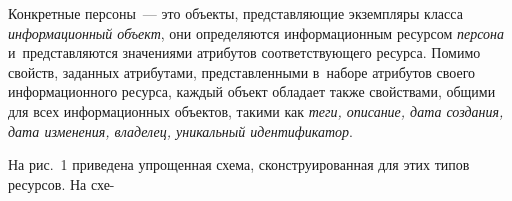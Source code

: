 \begin{multicols}{2}
    Конкретные персоны~--- это объекты, пред\-ставля\-ющие экземпляры 
класса \textit{информационный объект}, они определяются 
информационным ре\-сурсом \textit{персона} и~представляются значениями %
атрибутов соответствующего ресурса. Помимо свойств, заданных 
атрибутами, представленными в~наборе атрибутов своего информационного 
ресурса, каж\-дый объект обладает также свойствами, общими для всех 
информационных объектов, такими как \textit{теги, описание, дата 
создания, дата изменения, владелец, уникальный идентификатор}. 
    
    На рис.~1 приведена упрощенная схема, сконструированная для этих 
типов ресурсов. На схе-\linebreak\vspace*{-12pt}

\pagebreak

\end{multicols}

     \begin{figure*} %
      \vspace*{1pt}
\begin{center}
\mbox{%
\epsfxsize=158.401mm
}
\end{center}
\vspace*{-9pt}
\vspace*{4pt}
\end{figure*}

